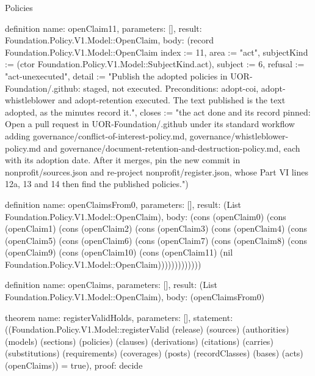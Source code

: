 \begin{lexlean}{Policies}
\begin{semanticmodule}
definition{
  name: openClaim11,
  parameters: [],
  result: Foundation.Policy.V1.Model::OpenClaim,
  body: (record Foundation.Policy.V1.Model::OpenClaim {index := 11, area := "act", subjectKind := (ctor Foundation.Policy.V1.Model::SubjectKind.act), subject := 6, refusal := "act-unexecuted", detail := "Publish the adopted policies in UOR-Foundation/.github: staged, not executed. Preconditions: adopt-coi, adopt-whistleblower and adopt-retention executed. The text published is the text adopted, as the minutes record it.", closes := "the act done and its record pinned: Open a pull request in UOR-Foundation/.github under its standard workflow adding governance/conflict-of-interest-policy.md, governance/whistleblower-policy.md and governance/document-retention-and-destruction-policy.md, each with its adoption date. After it merges, pin the new commit in nonprofit/sources.json and re-project nonprofit/register.json, whose Part VI lines 12a, 13 and 14 then find the published policies."})
}

definition{
  name: openClaimsFrom0,
  parameters: [],
  result: (List Foundation.Policy.V1.Model::OpenClaim),
  body: (cons (openClaim0) (cons (openClaim1) (cons (openClaim2) (cons (openClaim3) (cons (openClaim4) (cons (openClaim5) (cons (openClaim6) (cons (openClaim7) (cons (openClaim8) (cons (openClaim9) (cons (openClaim10) (cons (openClaim11) (nil Foundation.Policy.V1.Model::OpenClaim)))))))))))))
}

definition{
  name: openClaims,
  parameters: [],
  result: (List Foundation.Policy.V1.Model::OpenClaim),
  body: (openClaimsFrom0)
}

theorem{
  name: registerValidHolds,
  parameters: [],
  statement: ((Foundation.Policy.V1.Model::registerValid (release) (sources) (authorities) (models) (sections) (policies) (clauses) (derivations) (citations) (carries) (substitutions) (requirements) (coverages) (posts) (recordClasses) (bases) (acts) (openClaims)) = true),
  proof: decide{}
}
\end{semanticmodule}
\end{lexlean}
